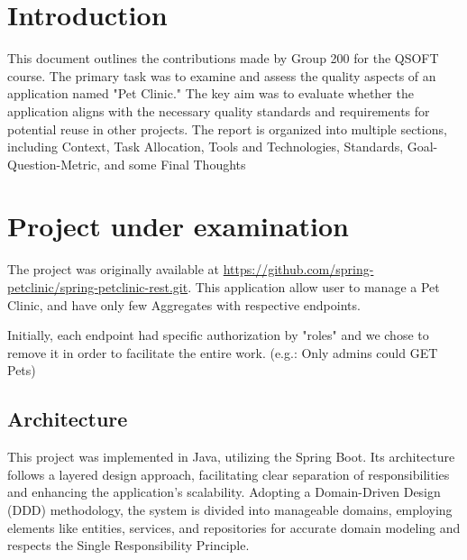 \documentclass[a4paper,11pt,openright,BCOR=15mm]{scrbook}
\begin{document}
	\cleardoublepage
	

	
	
	
	\tableofcontents
	\listoffigures
	
	
	
	
	\mainmatter 
	
	
	
	\chapter{Introduction}
	
	This document outlines the contributions made by Group 200 for the QSOFT course. The primary task was to examine and assess the quality aspects of an application named "Pet Clinic." The key aim was to evaluate whether the application aligns with the necessary quality standards and requirements for potential reuse in other projects. The report is organized into multiple sections, including Context, Task Allocation, Tools and Technologies, Standards, Goal-Question-Metric, and some Final Thoughts
	
	
	
	\chapter{Project under examination}
	
	The project was originally available at \url{https://github.com/spring-petclinic/spring-petclinic-rest.git}. This application allow user to manage a Pet Clinic, and have only few Aggregates with respective endpoints.
	
	Initially, each endpoint had specific authorization by "roles" and we chose to remove it in order to facilitate the entire work. (e.g.: Only admins could GET Pets)
	
		\section{Architecture}
		This project was implemented in Java, utilizing the Spring Boot. Its architecture follows a layered design approach, facilitating clear separation of responsibilities and enhancing the application’s scalability. Adopting a Domain-Driven Design (DDD) methodology, the system is divided into manageable domains, employing elements like entities, services, and repositories for accurate domain modeling and respects the Single Responsibility Principle.
		
\end{document}
